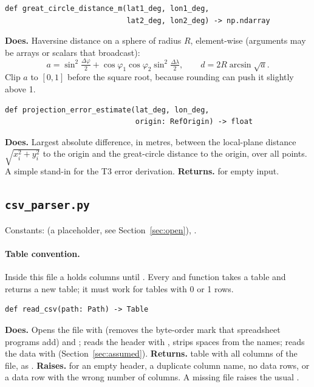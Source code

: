 \documentclass{article}
\newenvironment{card}{\par\smallskip\noindent\begin{minipage}{\linewidth}}{\end{minipage}\par}
\begin{document}
\begin{card}
\begin{lstlisting}[style=sig]
def great_circle_distance_m(lat1_deg, lon1_deg,
                            lat2_deg, lon2_deg) -> np.ndarray
\end{lstlisting}
\textbf{Does.} Haversine distance on a sphere of radius $R$, element-wise
(arguments may be arrays or scalars that broadcast):
\begin{equation*}
  a=\sin^2\tfrac{\Delta\varphi}{2}
    +\cos\varphi_1\cos\varphi_2\sin^2\tfrac{\Delta\lambda}{2},\qquad
  d = 2R\arcsin\sqrt{a}.
\end{equation*}
Clip $a$ to $[0,1]$ before the square root, because rounding can push it
slightly above 1.
\end{card}

\begin{card}
\begin{lstlisting}[style=sig]
def projection_error_estimate(lat_deg, lon_deg,
                              origin: RefOrigin) -> float
\end{lstlisting}
\textbf{Does.} Largest absolute difference, in metres, between the local-plane
distance $\sqrt{x_i^2+y_i^2}$ to the origin and the great-circle distance to
the origin, over all points. A simple stand-in for the T3 error derivation.
\textbf{Returns.}  for empty input.
\end{card}

\subsection{\texttt{csv\_parser.py}}

Constants:  (a placeholder, see
Section~\ref{sec:open}), .

\paragraph{Table convention.} Inside this file a  holds
 columns until . Every  and
 function takes a table and returns a new table; it must
work for tables with 0 or 1 rows.

\begin{card}
\begin{lstlisting}[style=sig]
def read_csv(path: Path) -> Table
\end{lstlisting}
\textbf{Does.} Opens the file with  (removes the
byte-order mark that spreadsheet programs add) and ; reads the
header with , strips spaces from the names; reads the data
with  (Section~\ref{sec:assumed}). \textbf{Returns.} table with all
columns of the file, as . \textbf{Raises.} 
for an empty header, a duplicate column name, no data rows, or a data row with
the wrong number of columns. A missing file raises the usual
.
\end{card}
\end{document}
